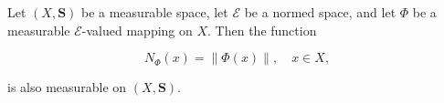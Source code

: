 Let $(X, \mathbf{S})$ be a measurable space, let $\mathcal{E}$ be a normed space, and let $\Phi$ be a measurable $\mathcal{E}$-valued mapping on $X$. Then the function

$$N_{\Phi}(x) = \| \Phi(x) \|, \quad x \in X,$$

is also measurable on $(X, \mathbf{S})$.

